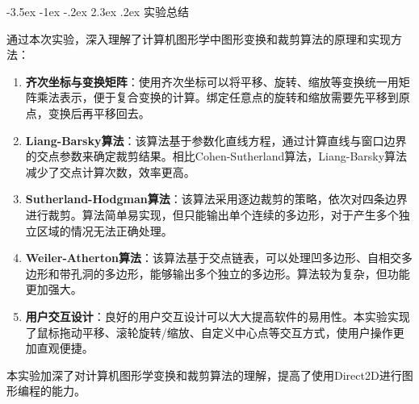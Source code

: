 \documentclass[12pt,a4paper]{article}
\makeatletter
\renewcommand\section{\@startsection{section}{1}{\z@}%
    {-3.5ex \@plus -1ex \@minus -.2ex}%
    {2.3ex \@plus.2ex}%
    {\normalfont\Large\bfseries\songti}}
\makeatother
\begin{document}
\begin{tcolorbox}

\section{实验总结}

通过本次实验，深入理解了计算机图形学中图形变换和裁剪算法的原理和实现方法：

\begin{enumerate}
    \item \textbf{齐次坐标与变换矩阵}：使用齐次坐标可以将平移、旋转、缩放等变换统一用矩阵乘法表示，便于复合变换的计算。绑定任意点的旋转和缩放需要先平移到原点，变换后再平移回去。
    
    \item \textbf{Liang-Barsky算法}：该算法基于参数化直线方程，通过计算直线与窗口边界的交点参数来确定裁剪结果。相比Cohen-Sutherland算法，Liang-Barsky算法减少了交点计算次数，效率更高。
    
    \item \textbf{Sutherland-Hodgman算法}：该算法采用逐边裁剪的策略，依次对四条边界进行裁剪。算法简单易实现，但只能输出单个连续的多边形，对于产生多个独立区域的情况无法正确处理。
    
    \item \textbf{Weiler-Atherton算法}：该算法基于交点链表，可以处理凹多边形、自相交多边形和带孔洞的多边形，能够输出多个独立的多边形。算法较为复杂，但功能更加强大。
    
    \item \textbf{用户交互设计}：良好的用户交互设计可以大大提高软件的易用性。本实验实现了鼠标拖动平移、滚轮旋转/缩放、自定义中心点等交互方式，使用户操作更加直观便捷。
\end{enumerate}

本实验加深了对计算机图形学变换和裁剪算法的理解，提高了使用Direct2D进行图形编程的能力。
\end{tcolorbox}
\end{document}
